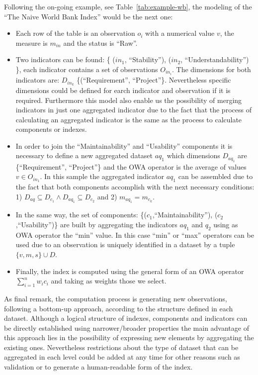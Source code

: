 Following the on-going example, see Table~\ref{tab:example-wb}, the modeling of the ``The Naive World Bank Index'' would be the next one:
\begin{itemize}
 \item Each row of the table is an observation $o_i$ with a numerical value $v$, the measure is $m_{in}$ and the status is ``Raw''.
 \item Two indicators can be found: \{ ($in_1$, ``Stability''), ($in_2$, ``Understandability'') \}, each indicator contains a set 
 of observations $O_{in_i}$. The dimensions for both indicators are: $D_{in_k}$  \{(``Requirement'', ``Project''\}. Nevertheless specific dimensions 
 could be defined for earch indicator and observation if it is required. Furthermore this model also enable us the possibility of 
 merging indicators in just one aggregated indicator due to the fact that the process of calculating an aggregated indicator is 
 the same as the process to calculate components or indexes.
 
  \item In order to join the ``Maintainability'' and ``Usability'' components it is necessary to define a new aggregated dataset $aq_1$ which 
 dimensions $D_{aq_1}$ are \{``Requirement'', ``Project''\} and the OWA operator is the average of values $v \in O_{in_1}$. In this sample the aggregated indicator $aq_1$
 can be assembled due to the fact that both components accomplish with the next necessary conditions: 
 1) $D_{aq} \subseteq D_{c_1} \wedge D_{aq_1} \subseteq D_{c_2}$ and  2) $m_{aq_1}= m_{c_k}$.
 
 \item In the same way, the set of components: \{($c_1$,``Maintainability''), ($c_2$,``Usability'')\} are built by aggregating the indicators $aq_1$ and 
 $q_2$ using as OWA operator the ``min'' value. In this case ``min'' or ``max'' operators can be used due to an observation is uniquely identified in a 
 dataset by a tuple $\{v,m,s\} \cup D$. 
 \item Finally, the index is computed using the general form of an OWA operator $\sum_{i=1}^n  w_i c_i$ and taking as weights those we select. 
 

\end{itemize}

As final remark, the computation process is generating new observations, following a bottom-up approach, according to the structure defined 
in each dataset. Although a logical structure of indexes, components and indicators can be directly established using narrower/broader properties 
the main advantage of this approach lies in the possibility of expressing new elements by aggregating the existing ones. Nevertheless restrictions 
about the type of dataset that can be aggregated in each level could be added at any time for other reasons such as validation or to generate 
a human-readable form of the index.



